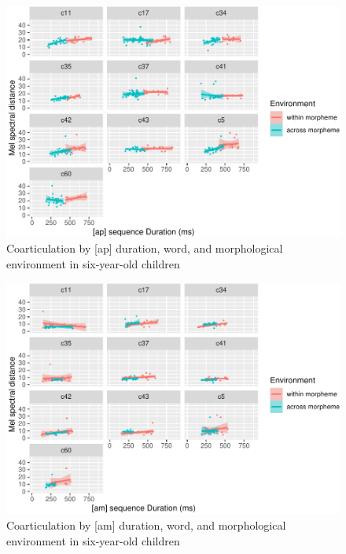 \documentclass[
]{article}
\begin{document}
\begin{figure}
\centering
\includegraphics{3_ch3_results_files/figure-latex/six-facet-ap-1.pdf}
\caption{\label{fig:six-facet-ap}Coarticulation by {[}ap{]} duration, word, and morphological environment in six-year-old children}
\end{figure}

\begin{figure}
\centering
\includegraphics{3_ch3_results_files/figure-latex/six-facet-am-1.pdf}
\caption{\label{fig:six-facet-am}Coarticulation by {[}am{]} duration, word, and morphological environment in six-year-old children}
\end{figure}
\end{document}
